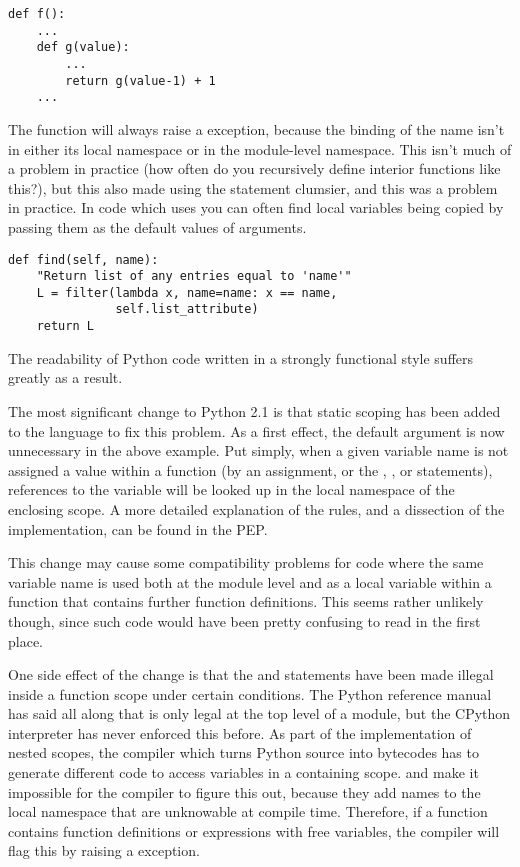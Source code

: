 \documentclass{howto}
\begin{document}
\begin{verbatim}
def f():
    ...
    def g(value):
        ...
        return g(value-1) + 1
    ...
\end{verbatim}

The function  will always raise a 
exception, because the binding of the name  isn't in either
its local namespace or in the module-level namespace.  This isn't much
of a problem in practice (how often do you recursively define interior
functions like this?), but this also made using the 
statement clumsier, and this was a problem in practice.  In code which
uses  you can often find local variables being copied
by passing them as the default values of arguments.

\begin{verbatim}
def find(self, name):
    "Return list of any entries equal to 'name'"
    L = filter(lambda x, name=name: x == name,
               self.list_attribute)
    return L
\end{verbatim}

The readability of Python code written in a strongly functional style
suffers greatly as a result.

The most significant change to Python 2.1 is that static scoping has
been added to the language to fix this problem.  As a first effect,
the  default argument is now unnecessary in the above
example.  Put simply, when a given variable name is not assigned a
value within a function (by an assignment, or the ,
, or  statements), references to the
variable will be looked up in the local namespace of the enclosing
scope.  A more detailed explanation of the rules, and a dissection of
the implementation, can be found in the PEP.

This change may cause some compatibility problems for code where the
same variable name is used both at the module level and as a local
variable within a function that contains further function definitions.
This seems rather unlikely though, since such code would have been
pretty confusing to read in the first place.

One side effect of the change is that the  and  statements have been made illegal inside
a function scope under certain conditions.  The Python reference
manual has said all along that  is
only legal at the top level of a module, but the CPython interpreter
has never enforced this before.  As part of the implementation of
nested scopes, the compiler which turns Python source into bytecodes
has to generate different code to access variables in a containing
scope.   and  make it
impossible for the compiler to figure this out, because they add names
to the local namespace that are unknowable at compile time.
Therefore, if a function contains function definitions or
 expressions with free variables, the compiler will
flag this by raising a  exception.
\end{document}
